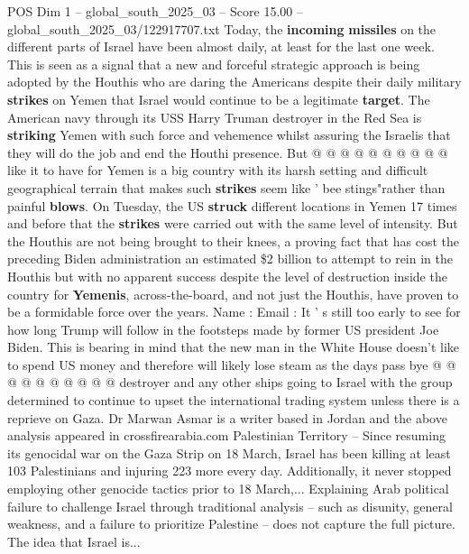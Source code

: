 \begin{textsample}{POS Dim 1 – global\_south\_2025\_03 – Score 15.00 – global\_south\_2025\_03/122917707.txt}
Today, the \textbf{incoming} \textbf{missiles} on the different parts of Israel have been almost daily, at least for the last one week.
This is seen as a signal that a new and forceful strategic approach is being adopted by the Houthis who are daring the Americans despite their daily military \textbf{strikes} on Yemen that Israel would continue to be a legitimate \textbf{target}.
The American navy through its USS Harry Truman destroyer in the Red Sea is \textbf{striking} Yemen with such force and vehemence whilst assuring the Israelis that they will do the job and end the Houthi presence.
But @ @ @ @ @ @ @ @ @ @ like it to have for Yemen is a big country with its harsh setting and difficult geographical terrain that makes such \textbf{strikes} seem like ' bee stings"rather than painful \textbf{blows}.
On Tuesday, the US \textbf{struck} different locations in Yemen 17 times and before that the \textbf{strikes} were carried out with the same level of intensity.
But the Houthis are not being brought to their knees, a proving fact that has cost the preceding Biden administration an estimated \$2 billion to attempt to rein in the Houthis but with no apparent success despite the level of destruction inside the country for \textbf{Yemenis}, across-the-board, and not just the Houthis, have proven to be a formidable force over the years.
Name : Email : It ' s still too early to see for how long Trump will follow in the footsteps made by former US president Joe Biden.
This is bearing in mind that the new man in the White House doesn't like to spend US money and therefore will likely lose steam as the days pass bye @ @ @ @ @ @ @ @ @ @ destroyer and any other ships going to Israel with the group determined to continue to upset the international trading system unless there is a reprieve on Gaza.
Dr Marwan Asmar is a writer based in Jordan and the above analysis appeared in crossfirearabia.com Palestinian Territory -- Since resuming its genocidal war on the Gaza Strip on 18 March, Israel has been killing at least 103 Palestinians and injuring 223 more every day.
Additionally, it never stopped employing other genocide tactics prior to 18 March,...
Explaining Arab political failure to challenge Israel through traditional analysis -- such as disunity, general weakness, and a failure to prioritize Palestine -- does not capture the full picture.
The idea that Israel is...

\end{textsample}
